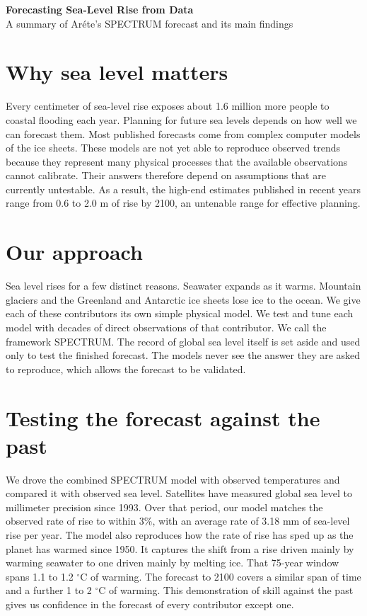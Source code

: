 \documentclass[11pt]{article}
\begin{document}
\begin{center}
{\Large\bfseries Forecasting Sea-Level Rise from Data}\\[3pt]
{\normalsize A summary of Ar\'{e}te's SPECTRUM forecast and its main findings}
\end{center}

\section{Why sea level matters}

Every centimeter of sea-level rise exposes about 1.6 million more people to coastal flooding each year. Planning for future sea levels depends on how well we can forecast them. Most published forecasts come from complex computer models of the ice sheets. These models are not yet able to reproduce observed trends because they represent many physical processes that the available observations cannot calibrate. Their answers therefore depend on assumptions that are currently untestable. As a result, the high-end estimates published in recent years range from 0.6 to 2.0 m of rise by 2100, an untenable range for effective planning.

\section{Our approach}

Sea level rises for a few distinct reasons. Seawater expands as it warms. Mountain glaciers and the Greenland and Antarctic ice sheets lose ice to the ocean. We give each of these contributors its own simple physical model. We test and tune each model with decades of direct observations of that contributor. We call the framework SPECTRUM. The record of global sea level itself is set aside and used only to test the finished forecast. The models never see the answer they are asked to reproduce, which allows the forecast to be validated.

\section{Testing the forecast against the past}

We drove the combined SPECTRUM model with observed temperatures and compared it with observed sea level. Satellites have measured global sea level to millimeter precision since 1993. Over that period, our model matches the observed rate of rise to within 3\%, with an average rate of 3.18 mm of sea-level rise per year. The model also reproduces how the rate of rise has sped up as the planet has warmed since 1950. It captures the shift from a rise driven mainly by warming seawater to one driven mainly by melting ice. That 75-year window spans 1.1 to 1.2 $^\circ$C of warming. The forecast to 2100 covers a similar span of time and a further 1 to 2 $^\circ$C of warming. This demonstration of skill against the past gives us confidence in the forecast of every contributor except one.
\end{document}
